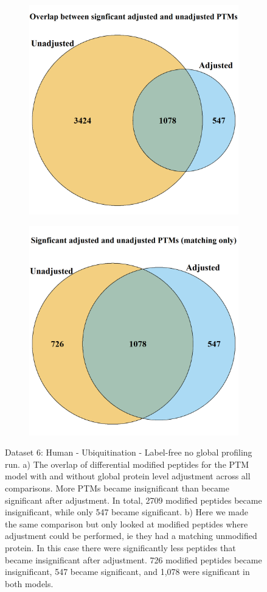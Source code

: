 \documentclass[mcp]{article}
\numberwithin{table}{section}
\begin{document}
\begin{figure}[h!]
\centering
 \begin{subfigure}{\textwidth}
 \centering
	\includegraphics[height=.525\textwidth]{images/usp30_venn_diagramm}
	\caption{}
	\label{fig:data6_vd1}
 \end{subfigure}
 \begin{subfigure}{\textwidth}
 \centering
	\includegraphics[height=.525\textwidth]{images/usp30_venn_diagramm_matching_only}
	\caption{}
	\label{fig:data6_vd2}
 \end{subfigure}
 \caption{Dataset 6: Human - Ubiquitination - Label-free no global profiling run. a) The overlap of differential modified peptides for the PTM model with and without global protein level adjustment across all comparisons. More PTMs became insignificant than became significant after adjustment. In total, 2709 modified peptides became insignificant, while only 547 became significant. b) Here we made the same comparison but only looked at modified peptides where adjustment could be performed, ie they had a matching unmodified protein. In this case there were significantly less peptides that became insignificant after adjustment. 726 modified peptides became insignificant, 547 became significant, and 1,078 were significant in both models.}
\label{fig:data6_plots}
\end{figure}
\end{document}
